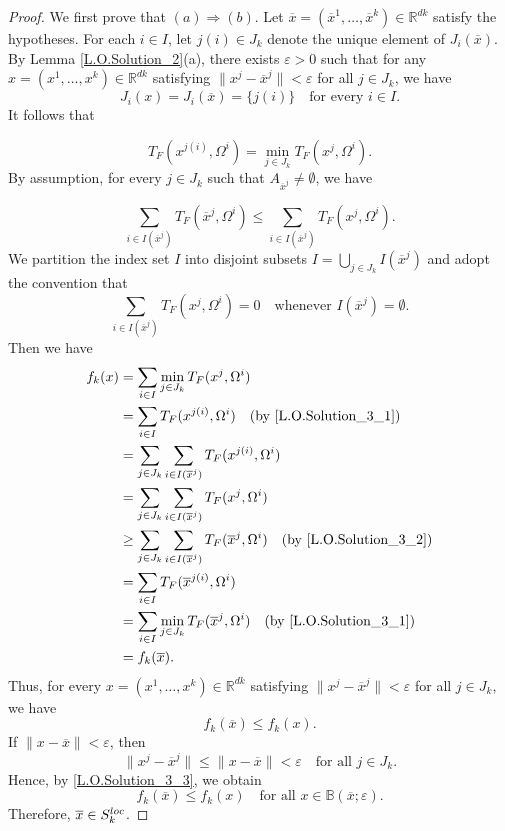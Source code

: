 \documentclass[10pt,a4paper]{amsart}
\begin{document}
\begin{proof} We first prove that $(a) \Rightarrow (b)$. Let $\overline{x}=(\overline{x}^1,\dots,\overline{x}^k)\in \mathbb{R}^{dk}$ satisfy the hypotheses. For each $i \in I$, let $j(i)\in J_k$ denote the unique element of $J_i(\overline{x})$. By Lemma \ref{L.O.Solution_2}(a), there exists $\varepsilon>0$ such that for any $x=(x^1,\dots,x^k)\in \mathbb{R}^{dk}$ satisfying $\|x^j-\overline{x}^j\|<\varepsilon$ for all $j \in J_k$, we have $$J_i(x)=J_i(\overline{x})=\{j(i)\}\quad\text{for every }i \in I.$$ It follows that
	
	\begin{equation}
		\label{L.O.Solution_3_1}T_F(x^{j(i)},\Omega^i)=\min_{j \in J_k}T_F(x^j,\Omega^i).
	\end{equation}
	By assumption, for every $j \in J_k$ such that $A_{\overline{x}^j} \neq \emptyset$, we have
	
	\begin{equation}
		\label{L.O.Solution_3_2}
		\sum_{i\in I(\overline{x}^j)}T_F(\overline{x}^j,\Omega^i)\leq\sum_{i\in I(\overline{x}^j)}T_F(x^j,\Omega^i).
	\end{equation}
	We partition the index set $I$ into disjoint subsets $I = \bigcup_{j \in J_k} I(\overline{x}^j)$ and adopt the convention that$$\sum_{i \in I(\overline{x}^j)} T_F(x^j, \Omega^i) = 0 \quad \text{whenever } I(\overline{x}^j) = \emptyset.$$
	Then we have
	\[
	\begin{aligned}
		f_k(x) 
		&= \sum_{i \in I} \min_{j \in J_k} T_F(x^j,\Omega^i) \\
		&= \sum_{i \in I} T_F(x^{j(i)},\Omega^i) \quad (\text{by \eqref{L.O.Solution_3_1}})\\ 
		&= \sum_{j \in J_k} \sum_{i \in I(\overline{x}^j)} T_F(x^{j(i)},\Omega^i) \\
		&= \sum_{j \in J_k} \sum_{i \in I(\overline{x}^j)} T_F(x^j,\Omega^i) \\
		&\geq \sum_{j \in J_k} \sum_{i \in I(\overline{x}^j)} T_F(\overline{x}^{j},\Omega^i) \quad (\text{by \eqref{L.O.Solution_3_2}})\\
		&= \sum_{i \in I} T_F(\overline{x}^{j(i)},\Omega^i) \\
		&= \sum_{i \in I} \min_{j\in J_k}T_F(\overline{x}^j,\Omega^i) \quad (\text{by \eqref{L.O.Solution_3_1}})\\
		&= f_k(\overline{x}).
	\end{aligned}
	\]
	Thus, for every $x=(x^1,\dots,x^k) \in \mathbb{R}^{dk}$ satisfying $\|x^j-\overline{x}^j \|<\varepsilon$ for all $j \in J_k$, we have
	\begin{equation}
		\label{L.O.Solution_3_3}
		f_k(\overline{x}) \leq f_k(x).
	\end{equation}
	If $\|x-\overline{x}\|<\varepsilon$, then
	\[
	\|x^j-\overline{x}^j\|\le \|x-\overline{x}\|<\varepsilon
	\quad \text{for all } j \in J_k.
	\]
	Hence, by \eqref{L.O.Solution_3_3}, we obtain
	\[
	f_k(\overline{x})\le f_k(x)
	\quad \text{for all } x\in\mathbb{B}(\overline{x};\varepsilon).
	\]
	Therefore, $\overline{x}\in S_k^{{\rm loc}}$.
	

\end{proof}
\end{document}
